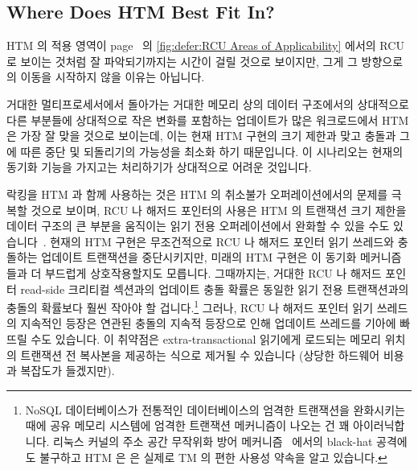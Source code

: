 \fi

\subsection{Where Does HTM Best Fit In?}
\label{sec:future:Where Does HTM Best Fit In?}

HTM 의 적용 영역이
page~\pageref{fig:defer:RCU Areas of Applicability} 의
\cref{fig:defer:RCU Areas of Applicability} 에서의 RCU 로 보이는 것처럼 잘
파악되기까지는 시간이 걸릴 것으로 보이지만, 그게 그 방향으로의 이동을 시작하지
않을 이유는 아닙니다.

거대한 멀티프로세서에서 돌아가는 거대한 메모리 상의 데이터 구조에서의
상대적으로 다른 부분들에 상대적으로 작은 변화를 포함하는 업데이트가 많은
워크로드에서 HTM 은 가장 잘 맞을 것으로 보이는데, 이는 현재 HTM 구현의 크기
제한과 맞고 충돌과 그에 따른 중단 및 되돌리기의 가능성을 최소화 하기
때문입니다.
이 시나리오는 현재의 동기화 기능을 가지고는 처리하기가 상대적으로 어려운
것입니다.

\iffalse

Although it will likely be some time before HTM's area of applicability
can be as crisply delineated as that shown for RCU in
\cref{fig:defer:RCU Areas of Applicability} on
page~\pageref{fig:defer:RCU Areas of Applicability}, that is no reason not to
start moving in that direction.

HTM seems best suited to update-heavy workloads involving relatively
small changes to disparate portions of relatively large in-memory
data structures running on large multiprocessors,
as this meets the size restrictions of current HTM implementations while
minimizing the probability of conflicts and attendant aborts and
rollbacks.
This scenario is also one that is relatively difficult to handle given
current synchronization primitives.

\fi

락킹을 HTM 과 함께 사용하는 것은 HTM 의 취소불가 오퍼레이션에서의 문제를 극복할
것으로 보이며, RCU 나 해저드 포인터의 사용은 HTM 의 트랜잭션 크기 제한을 데이터
구조의 큰 부분을 움직이는 읽기 전용 오퍼레이션에서 완화할 수 있을 수도
있습니다~\cite{SeongJaePark2020HTMRCUlock}.
현재의 HTM 구현은 무조건적으로 RCU 나 해저드 포인터 읽기 쓰레드와 충돌하는
업데이트 트랜잭션을 중단시키지만, 미래의 HTM 구현은 이 동기화 메커니즘들과 더
부드럽게 상호작용할지도 모릅니다.
그때까지는, 거대한 RCU 나 해저드 포인터 read-side 크리티컬 섹션과의 업데이트
충돌 확률은 동일한 읽기 전용 트랜잭션과의 충돌의 확률보다 훨씬 작아야 할
겁니다.\footnote{
	NoSQL 데이터베이스가 전통적인 데이터베이스의 엄격한 트랜잭션을
	완화시키는 때에 공유 메모리 시스템에 엄격한 트랜잭션 메커니즘이 나오는
	건 꽤 아이러닉합니다.
	리눅스 커널의 주소 공간 무작위화 방어
	메커니즘~\cite{YeongjinJang2016TSXbreakKASLR,Jang:2016:BKA:2976749.2978321}
	에서의 black-hat 공격에도 불구하고 HTM 은 은 실제로 TM 의 편한 사용성
	약속을 알고 있습니다.}
그러나, RCU 나 해저드 포인터 읽기 쓰레드의 지속적인 등장은 연관된 충돌의 지속적
등장으로 인해 업데이트 쓰레드를 기아에 빠뜨릴 수도 있습니다.
이 취약점은 extra-transactional 읽기에게 로드되는 메모리 위치의 트랜잭션 전
복사본을 제공하는 식으로 제거될 수 있습니다 (상당한 하드웨어 비용과 복잡도가
들겠지만).


